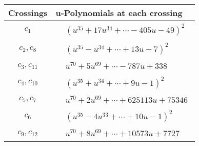 \documentclass[1p]{elsarticle_modified}
\theoremstyle{definition}
\begin{document}
\begin{tabular}{m{50pt}|m{274pt}}
Crossings & \hspace{64pt}u-Polynomials at each crossing \\
\hline $$\begin{aligned}c_{1}\end{aligned}$$&$\begin{aligned}
&(u^{35}+17 u^{34}+\cdots-405 u-49)^{2}
\end{aligned}$\\
\hline $$\begin{aligned}c_{2},c_{8}\end{aligned}$$&$\begin{aligned}
&(u^{35}- u^{34}+\cdots+13 u-7)^{2}
\end{aligned}$\\
\hline $$\begin{aligned}c_{3},c_{11}\end{aligned}$$&$\begin{aligned}
&u^{70}+5 u^{69}+\cdots-787 u+338
\end{aligned}$\\
\hline $$\begin{aligned}c_{4},c_{10}\end{aligned}$$&$\begin{aligned}
&(u^{35}+u^{34}+\cdots+9 u-1)^{2}
\end{aligned}$\\
\hline $$\begin{aligned}c_{5},c_{7}\end{aligned}$$&$\begin{aligned}
&u^{70}+2 u^{69}+\cdots+625113 u+75346
\end{aligned}$\\
\hline $$\begin{aligned}c_{6}\end{aligned}$$&$\begin{aligned}
&(u^{35}-4 u^{33}+\cdots+10 u-1)^{2}
\end{aligned}$\\
\hline $$\begin{aligned}c_{9},c_{12}\end{aligned}$$&$\begin{aligned}
&u^{70}+8 u^{69}+\cdots+10573 u+7727
\end{aligned}$\\
\hline
\end{tabular}\\~\\
\end{document}
